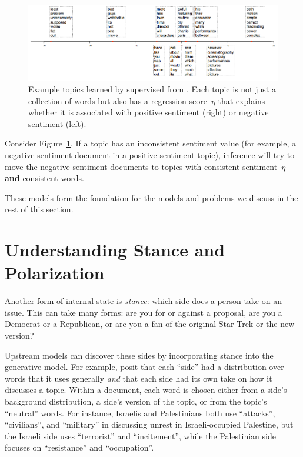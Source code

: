 \begin{figure}
  \begin{center}
    \includegraphics[width=1.0\linewidth]{figures/slda}
  \end{center}
  \caption{Example topics learned by supervised  from
    \citet{blei-07b}.  Each topic is not just a collection of words
    but also has a regression score~$\eta$ that explains whether it is
    associated with positive sentiment (right) or negative sentiment
    (left).}
  \label{fig:slda-topics}
\end{figure}

Consider Figure~\ref{fig:slda-topics}.  If a topic has an inconsistent
sentiment value (for example, a negative sentiment document in a
positive sentiment topic), inference will try to move the negative
sentiment documents to topics with consistent sentiment~$\eta$ {\bf
  and} consistent words.  

These models form the foundation for the models and problems we
discuss in the rest of this section.

\section{Understanding Stance and Polarization}

Another form of internal state is \emph{stance}: which side does a
person take on an issue.  This can take many forms: are you for or
against a proposal, are you a Democrat or a Republican, or are you a
fan of the original Star Trek or the new version?

Upstream models can discover these sides by incorporating stance into
the generative model.  For example, \citet{paul-10} posit that each
``side'' had a distribution over words that it uses generally
\emph{and} that each side had its own take on how it discusses a
topic.  Within a document, each word is chosen either from a side's
background distribution, a side's version of the topic, or from the
topic's ``neutral'' words.  For instance, Israelis and Palestinians
both use ``attacks'', ``civilians'', and ``military'' in discussing
unrest in Israeli-occupied Palestine, but the Israeli side uses
``terrorist'' and ``incitement'', while the Palestinian side focuses
on ``resistance'' and ``occupation''.

